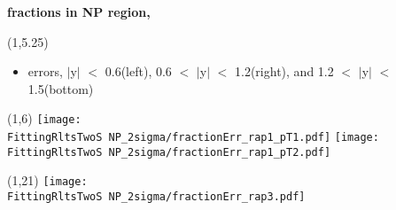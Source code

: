 \documentclass[11pt,slidescentered,red,compress,handout,hyperref={bookmarks=true},mathseriftable]{beamer}
\newcommand{\FittingRltsTwoS}{../Psi2S/Fit/parameter/evaluateCtau/}
\begin{document}
\begin{frame}[t]{\small \bf fractions in NP region,  }{}
\begin{textblock}{48}(1,5.25)
\begin{itemize}
\scriptsize \item errors, $|$y$|$ $<$ 0.6(left), 0.6 $<$ $|$y$|$ $<$ 1.2(right), and 1.2 $<$ $|$y$|$ $<$ 1.5(bottom)
\end{itemize}
\end{textblock}
\begin{textblock}{48}(1,6)
\hspace*{10pt} \texttt{[image: \\FittingRltsTwoS NP\_2sigma/fractionErr\_rap1\_pT1.pdf]}
\hspace*{10pt} \texttt{[image: \\FittingRltsTwoS NP\_2sigma/fractionErr\_rap1\_pT2.pdf]}
\begin{textblock}{48}(1,21)
\hspace*{10pt} \texttt{[image: \\FittingRltsTwoS NP\_2sigma/fractionErr\_rap3.pdf]}
\end{textblock}
\end{textblock}
\end{frame}
\end{document}
